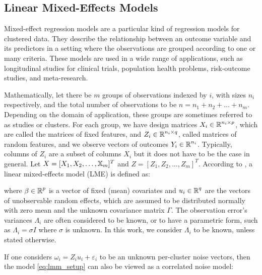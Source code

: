 \documentclass[11pt,letterpaper]{article}
\numberwithin{equation}{section} %
\numberwithin{figure}{section} %
\numberwithin{table}{section} %
\begin{document}
\label{ch:literature_review}
\subsection{Linear Mixed-Effects Models}
Mixed-effect regression models are a particular kind of regression models for clustered data. They describe the relationship between an outcome variable and its predictors in a setting where the observations are grouped according to one or many criteria. These models are used in a wide range of applications, such as longitudinal studies for clinical trials, population health problems, risk-outcome studies, and meta-research.


Mathematically, let there be $m$ groups of observations indexed by $i$, with sizes $n_i$ respectively, and the total number of observations to be $n = n_1 + n_2 + \dots + n_m$. Depending on the domain of application, these groups are sometimes referred to as studies or clusters. For each group, we have design matrices $X_i \in \operatorname{\mathbb{R}}^{n_i \times p}$, which are called the matrices of fixed features, and $Z_i \in \operatorname{\mathbb{R}}^{n_i \times q}$, called matrices of random features, and we observe vectors of outcomes $Y_i \in \operatorname{\mathbb{R}}^{n_i}$. Typically, columns of $Z_i$ are a subset of columns $X_i$ but it does not have to be the case in general. Let $X = [X_1, X_2, \dots, \operatorname{\mathbb{X}}_m]^T$ and $Z = [Z_1, Z_2, \dots, Z_m]^T$. According to \cite{Patterson1971, Pinheiro2000}, a linear mixed-effects model (LME) is defined as:



 where $\beta \in \operatorname{\mathbb{R}}^p$ is a vector of fixed (mean) covariates and $u_i \in \operatorname{\mathbb{R}}^{q}$ are the vectors of unobservable random effects, which are assumed to be distributed normally with zero mean and the unknown covariance matrix $\Gamma$. The observation error's variances $\Lambda_i$ are often considered to be known, or to have a parametric form, such as $\Lambda_i = \sigma I$ where $\sigma$ is unknown. In this work, we consider $\Lambda_i$ to be known, unless stated otherwise.
  
 If one considers $\omega_i = Z_i u_i + \varepsilon_i$ to be an unknown per-cluster noise vectors, then the model \ref{eq:lmm_setup} can also be viewed as a correlated noise model:
 
\end{document}
